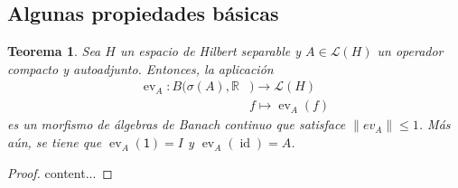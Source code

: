 \documentclass[11pt]{report}
\theoremstyle{colored}
\newtheorem{theorem}{Teorema}[section]
\newcommand{\R}{\mathbb{R}}
\newcommand{\ev}{\operatorname{ev}}
\newcommand{\id}{\operatorname{id}}
\begin{document}
\subsection{Algunas propiedades básicas}

\begin{theorem} Sea $H$ un espacio de Hilbert separable y $A \in \mathscr{L}(H)$ un operador compacto y autoadjunto. Entonces, la aplicación
\begin{align*}
\ev_A : B(\sigma(A),\R&) \to \mathscr{L}(H)\\
&f \mapsto \ev_A(f)
\end{align*}
es un morfismo de álgebras de Banach continuo que satisface $\|ev_A\| \leq 1$. Más aún, se tiene que $\ev_A(\mathsf{1}) = I$ y $\ev_A(\id) = A$. 
\end{theorem}
\begin{proof}
content...
\end{proof}
\end{document}
